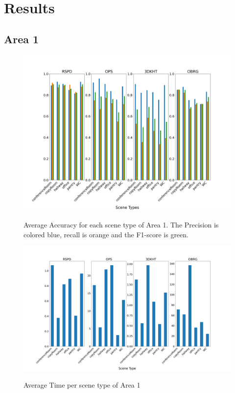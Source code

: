 \documentclass[main.tex]{subfiles}
\begin{document}
\section{Results}

\subsection{Area 1}
\begin{figure}[H]
	\centering
	\includegraphics[width=15 cm]{images/area_1_acc.png}
	\label{fig:area1A}
    \caption[Accuracies Area 1]{Average Accuracy for each scene type of Area 1. The Precision 
    is colored blue, recall is orange and the F1-score is green. }
\end{figure}

\begin{figure}[H]
    \centering
	\includegraphics[width=15 cm]{images/area_1_time.png}
	\label{fig:area1T}
    \caption[Times Area 1]{Average Time per scene type of Area 1}
\end{figure}
\end{document}
